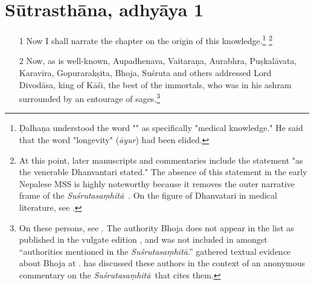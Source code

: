 \documentclass[12pt]{article}
\renewcommand{\SS}{\emph{Suśrutasaṃhitā}}
\begin{document}
    \section{Sūtrasthāna, adhyāya 1}
\begin{itemize}
    \item [1]
    Now I shall narrate the chapter on the origin of this knowledge.\footnote{Ḍalhaṇa 
    understood the word "" as specifically "medical knowledge."  
    He said that the word "longevity" (\emph{āyur}) 
     had been elided.}
%    
%    
%    
\footnote{At this point, later manuscripts and commentaries include
the statement "as the venerable Dhanvantari stated."  The absence of this
statement in the early Nepalese MSS is highly noteworthy because it removes
the outer narrative frame of the \SS\
\parencites[148]{wuja-2013}[\S\,3.1.2]{kleb-2021b}.  On the figure of Dhanvatari in 
medical literature, see \cite[IA 358--361]{meul-hist}.} %
    
    \item[2] Now, as is well-known, Aupadhenava, Vaitaraṇa, Aurabhra, Puṣkalāvata,
Karavīra, Gopurarakṣita, Bhoja, Suśruta and others addressed Lord Divodāsa,
king of Kāśi, the best of the immortals, who was in his ashram surrounded by
an entourage of sages.\footnote{On these persons, see \cite[IA
361--363, 369\,ff.]{meul-hist}. The authority Bhoja does not appear in the list as
published in the vulgate edition \citep[1]{susr-trikamji2}, and was not
included in \cite{meul-hist} amongst “authorities mentioned in the \SS.” 
\citeauthor{meul-hist} gathered textual evidence about Bhoja at \cite[IA
690--691]{meul-hist}. \citet{kleb-2021a} has discussed these authors in the
context of an anonymous commentary on the \SS\ that cites them.}

\nocite{emen-1969}
    
    

\end{itemize}
\end{document}
